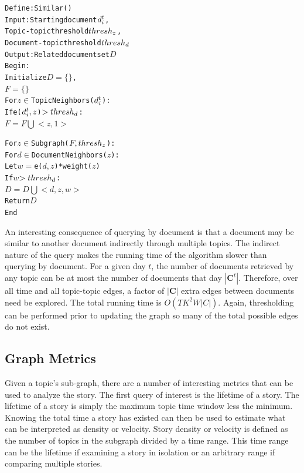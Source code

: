 \documentclass[10pt]{article}
\begin{document}
\begin{framed}
\begin{center}
\begin{alltt}
Define: Similar()
Input:  Starting document \(d\sb{i}\sp{t}\), 
        Topic-topic threshold \(thresh\sb{z}\),
        Document-topic threshold \(thresh\sb{d}\)
Output: Related document set \(D\)
Begin:
  Initialize \(D = \{\}\),             
             \(F = \{\}\)
  For \(z \in\) TopicNeighbors(\(d\sb{i}\sp{t}\)):
    If e(\(d\sb{i}\sp{t}, z\)) \(> thresh\sb{d}\):
      \(F = F \bigcup <z, 1>\)

  For \(z \in\) Subgraph(\(F, thresh\sb{z}\)):
    For \(d \in\) DocumentNeighbors(\(z\)):
      Let \(w = \)e(\(d, z\))*weight(\(z\))
      If \(w\) \(> thresh\sb{d}\):
        \(D = D \bigcup <d, z, w>\)
  Return \(D\)
End
\end{alltt}
\end{center}
\end{framed}

An interesting consequence of querying by document is that a document may be similar to another document indirectly through multiple topics. The indirect nature of the query makes the running time of the algorithm slower than querying by document.  For a given day $t$, the number of documents retrieved by any topic can be at most the number of documents that day $|\mathbf{C}^t|$.  Therefore, over all time and all topic-topic edges, a factor of $|\mathbf{C}|$ extra edges between documents need be explored.  The total running time is $O(TK^2W|C|)$.  Again, thresholding can be performed prior to updating the graph so many of the total possible edges do not exist.
  
\subsection {Graph Metrics}

Given a topic's sub-graph, there are a number of interesting metrics that can be used to analyze the story. The first query of interest is the lifetime of a story.  The lifetime of a story is simply the maximum topic time window less the minimum.  Knowing the total time a story has existed can then be used to estimate what can be interpreted as density or velocity.  Story density or velocity is defined as the number of topics in the subgraph divided by a time range.  This time range can be the lifetime if examining a story in isolation or an arbitrary range if comparing multiple stories.  
\end{document}
